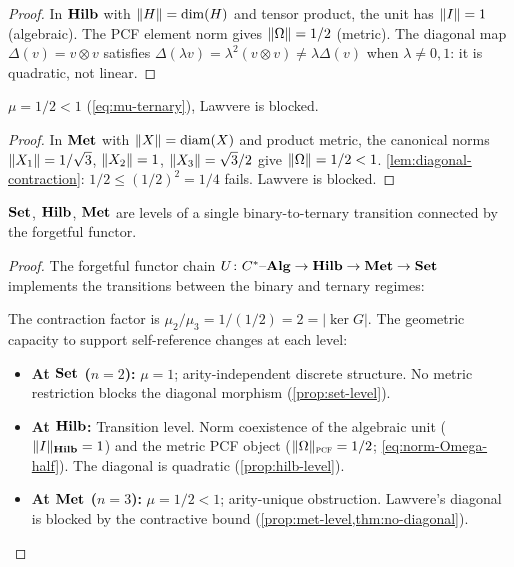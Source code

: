 \begin{proof}
In $\mathbf{Hilb}$ with $\|H\|=\dim(H)$ and tensor product, the unit has
$\|I\|=1$ (algebraic).  The PCF element norm gives
$\|\Omega\|=1/2$ (metric).  The diagonal map
$\Delta(v)=v\otimes v$ satisfies
$\Delta(\lambda v) = \lambda^2(v\otimes v)\ne\lambda\Delta(v)$ when
$\lambda\ne 0,1$: it is quadratic, not linear.
\end{proof}

\begin{proposition}\label{prop:met-level}
$\mu=1/2<1$
(\cref{eq:mu-ternary}), Lawvere is blocked.
\end{proposition}

\begin{proof}
In $\mathbf{Met}$ with $\|X\|=\mathrm{diam}(X)$ and product metric, the
canonical norms $\|X_1\|=1/\sqrt{3}$, $\|X_2\|=1$,
$\|X_3\|=\sqrt{3}/2$ give
$\|\Omega\|=1/2<1$.  \cref{lem:diagonal-contraction}:
$1/2\le(1/2)^2=1/4$ fails.  Lawvere is blocked.
\end{proof}

\begin{theorem}\label{thm:arity-transition}
$\mathbf{Set}$, $\mathbf{Hilb}$, $\mathbf{Met}$ are levels of a single binary-to-ternary
transition connected by the forgetful functor.
\end{theorem}

\begin{proof}
The forgetful functor chain $U\colon C^*\text{--}\mathbf{Alg} \to \mathbf{Hilb} \to \mathbf{Met} \to \mathbf{Set}$ implements the transitions between the binary and ternary regimes:
%
\begin{center}
\end{center}
%
\noindent
The contraction factor is $\mu_2/\mu_3 = 1/(1/2) = 2 = |\ker G|$. The geometric capacity to support self-reference changes at each level:
\begin{itemize}
  \item \textbf{At $\mathbf{Set}$ ($n=2$):} $\mu=1$; arity-independent discrete structure. No metric restriction blocks the diagonal morphism (\cref{prop:set-level}).
  \item \textbf{At $\mathbf{Hilb}$:} Transition level. Norm coexistence of the algebraic unit ($\|I\|_{\mathbf{Hilb}}=1$) and the metric PCF object ($\|\Omega\|_{\text{\textsc{pcf}}} = 1/2$; \cref{eq:norm-Omega-half}). The diagonal is quadratic (\cref{prop:hilb-level}).
  \item \textbf{At $\mathbf{Met}$ ($n=3$):} $\mu=1/2 < 1$; arity-unique obstruction. Lawvere's diagonal is blocked by the contractive bound (\cref{prop:met-level,thm:no-diagonal}).
\end{itemize}
\end{proof}


